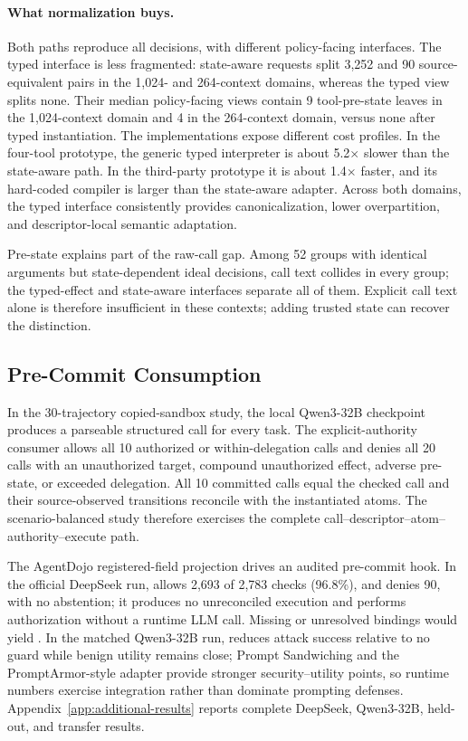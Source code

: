 \paragraph{What normalization buys.}
Both paths reproduce all decisions, with different policy-facing interfaces.
The typed interface is less fragmented: state-aware requests
split 3,252 and 90 source-equivalent pairs in the 1,024- and 264-context
domains, whereas the typed view splits none. Their median policy-facing views
contain 9 tool-pre-state leaves in the 1,024-context domain and 4 in the
264-context domain, versus none after typed instantiation.
The implementations expose different cost profiles. In the four-tool
prototype, the generic typed interpreter is about 5.2$\times$ slower than the
state-aware path. In the third-party prototype it is about 1.4$\times$ faster,
and its hard-coded compiler is larger than the state-aware adapter. Across both
domains, the typed interface consistently provides canonicalization, lower
overpartition, and descriptor-local semantic adaptation.

Pre-state explains part of the raw-call gap. Among 52 groups with identical
arguments but state-dependent ideal decisions, call text collides in every
group; the typed-effect and state-aware interfaces separate all of them.
Explicit call text alone is therefore insufficient in these contexts; adding
trusted state can recover the distinction.

\subsection{Pre-Commit Consumption}

In the 30-trajectory copied-sandbox study, the local Qwen3-32B checkpoint
produces a parseable structured call for every task. The explicit-authority consumer allows all 10
authorized or within-delegation calls and denies all 20 calls with an
unauthorized target, compound unauthorized effect, adverse pre-state, or
exceeded delegation. All 10 committed calls equal the checked call and their
source-observed transitions reconcile with the instantiated atoms. The
scenario-balanced study therefore exercises the complete
call--descriptor--atom--authority--execute path.

The AgentDojo registered-field projection drives an audited pre-commit hook.
In the official DeepSeek run, \sys{} allows 2,693 of 2,783 checks (96.8\%),
and denies 90, with no abstention; it produces no unreconciled execution and
performs authorization without a runtime LLM call. Missing or unresolved
bindings would yield \Abstain{}. In the matched Qwen3-32B run,
\sys{} reduces attack success relative to no guard while benign utility remains
close; Prompt Sandwiching and the PromptArmor-style adapter provide stronger
security--utility points, so runtime numbers exercise integration rather than
dominate prompting defenses. Appendix~\ref{app:additional-results} reports
complete DeepSeek, Qwen3-32B, held-out, and transfer results.
